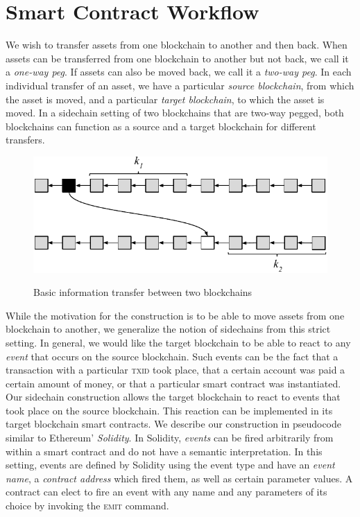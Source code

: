 \section{Smart Contract Workflow}


We wish to transfer assets from one blockchain to another and then back. When
assets can be transferred from one blockchain to another but not back, we call
it a \emph{one-way peg}. If assets can also be moved back, we call it a
\emph{two-way peg}. In each individual transfer of an asset, we have a
particular \emph{source blockchain}, from which the asset is moved, and a
particular \emph{target blockchain}, to which the asset is moved. In a sidechain
setting of two blockchains that are two-way pegged, both blockchains can
function as a source and a target blockchain for different transfers.

\begin{figure}[H]
    \vspace{-2em}
    \caption{Basic information transfer between two blockchains}
    \centering
    \includegraphics[width=0.7 \columnwidth,keepaspectratio]{chapters/sidechains/figures/events.pdf}
    \label{fig.events}
    \vspace{-2em}
\end{figure}

While the motivation for the construction is to be able to move assets from one
blockchain to another, we generalize the notion of sidechains from this strict
setting. In general, we would like the target blockchain to be able to react to
any \emph{event} that occurs on the source blockchain. Such events can be the
fact that a transaction with a particular \textsc{txid} took place, that a
certain account was paid a certain amount of money, or that a particular smart
contract was instantiated. Our sidechain construction allows the target
blockchain to react to events that took place on the source blockchain. This
reaction can be implemented in its target blockchain smart contracts. We
describe our construction in pseudocode similar to Ethereum' \emph{Solidity}. In
Solidity, \emph{events} can be fired arbitrarily from within a smart contract
and do not have a semantic interpretation. In this setting, events are defined
by Solidity using the \textsf{event} type and have an \emph{event name}, a
\emph{contract address} which fired them, as well as certain parameter values. A
contract can elect to fire an event with any name and any parameters of its
choice by invoking the \textsc{emit} command.

